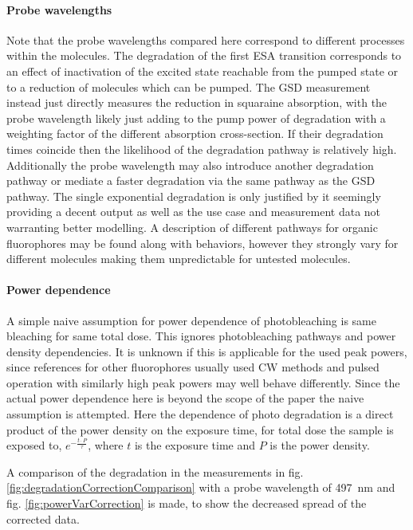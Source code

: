 \documentclass[twoside,openright]{scrreprt}
\begin{document}
\paragraph{Probe wavelengths}
Note that the probe wavelengths compared here correspond to different processes within the molecules. The degradation of the first ESA transition corresponds to an effect of inactivation of the excited state reachable from the pumped state or to a reduction of molecules which can be pumped. The GSD measurement instead just directly measures the reduction in squaraine absorption, with the probe wavelength likely just adding to the pump power of degradation with a weighting factor of the different absorption cross-section. If their degradation times coincide then the likelihood of the degradation pathway is relatively high. Additionally the probe wavelength may also introduce another degradation pathway or mediate a faster degradation via the same pathway as the GSD pathway. The single exponential degradation is only justified by it seemingly providing a decent output as well as the use case and measurement data not warranting better modelling. A description of different pathways for organic fluorophores may be found along with behaviors, however they strongly vary for different molecules making them unpredictable for untested molecules.\cite{Demchenko_2020}

\paragraph{Power dependence}
A simple naive assumption for power dependence of photobleaching is same bleaching for same total dose. This ignores photobleaching pathways and power density dependencies. It is unknown if this is applicable for the used peak powers, since references for other fluorophores usually used CW methods and pulsed operation with similarly high peak powers may well behave differently. Since the actual power dependence here is beyond the scope of the paper the naive assumption is attempted. Here the dependence of photo degradation is a direct product of the power density on the exposure time, for total dose the sample is exposed to, $e^{-\frac{t\cdot P}{\tau}}$, where $t$ is the exposure time and $P$ is the power density.\cite{Eggeling1998}

A comparison of the degradation in the measurements in fig. \ref{fig:degradationCorrectionComparison} with a probe wavelength of \SI{497}{\nano\meter} and fig. \ref{fig:powerVarCorrection} is made, to show the decreased spread of the corrected data.
\end{document}
